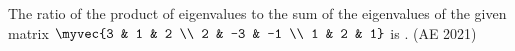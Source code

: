 \item  
The ratio of the product of eigenvalues to the sum of the eigenvalues of the given matrix
$
\myvec{3 & 1 & 2 \\ 2 & -3 & -1 \\ 1 & 2 & 1}
$
is \underline{\hspace{2cm}}.  
\hfill (AE 2021)
